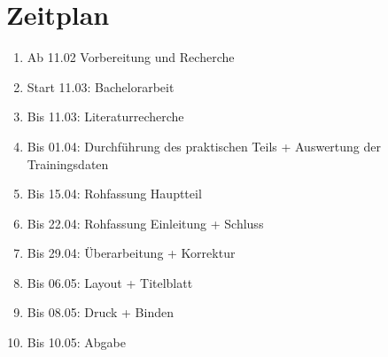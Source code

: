 \documentclass[a4paper,12pt,oneside]{article}
\begin{document}
  \newpage
  
  \section{Zeitplan}  
  
  \begin{enumerate}
  \item Ab 11.02     	Vorbereitung und Recherche
  \item Start 11.03: 	Bachelorarbeit
  \item Bis 11.03: 		Literaturrecherche
  \item Bis 01.04: 		Durchführung des praktischen Teils + Auswertung der Trainingsdaten
  \item Bis 15.04:		Rohfassung Hauptteil
  \item Bis 22.04:		Rohfassung Einleitung + Schluss
  \item Bis 29.04:		Überarbeitung + Korrektur
  \item Bis 06.05:		Layout + Titelblatt
  \item Bis 08.05:		Druck + Binden
  \item Bis 10.05:		Abgabe
  \end{enumerate}
  
\end{document}
